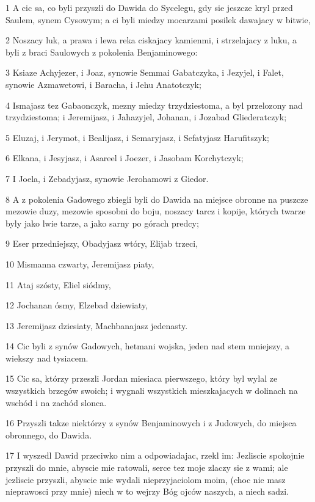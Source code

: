 \par 1 A cic sa, co byli przyszli do Dawida do Sycelegu, gdy sie jeszcze kryl przed Saulem, synem Cysowym; a ci byli miedzy mocarzami posilek dawajacy w bitwie,
\par 2 Noszacy luk, a prawa i lewa reka ciskajacy kamienmi, i strzelajacy z luku, a byli z braci Saulowych z pokolenia Benjaminowego:
\par 3 Ksiaze Achyjezer, i Joaz, synowie Semmai Gabatczyka, i Jezyjel, i Falet, synowie Azmawetowi, i Baracha, i Jehu Anatotczyk;
\par 4 Ismajasz tez Gabaonczyk, mezny miedzy trzydziestoma, a byl przelozony nad trzydziestoma; i Jeremijasz, i Jahazyjel, Johanan, i Jozabad Gliederatczyk;
\par 5 Eluzaj, i Jerymot, i Bealijasz, i Semaryjasz, i Sefatyjasz Harufitszyk;
\par 6 Elkana, i Jesyjasz, i Asareel i Joezer, i Jasobam Korchytczyk;
\par 7 I Joela, i Zebadyjasz, synowie Jerohamowi z Giedor.
\par 8 A z pokolenia Gadowego zbiegli byli do Dawida na miejsce obronne na puszcze mezowie duzy, mezowie sposobni do boju, noszacy tarcz i kopije, których twarze byly jako lwie tarze, a jako sarny po górach predcy;
\par 9 Eser przedniejszy, Obadyjasz wtóry, Elijab trzeci,
\par 10 Mismanna czwarty, Jeremijasz piaty,
\par 11 Ataj szósty, Eliel siódmy,
\par 12 Jochanan ósmy, Elzebad dziewiaty,
\par 13 Jeremijasz dziesiaty, Machbanajasz jedenasty.
\par 14 Cic byli z synów Gadowych, hetmani wojska, jeden nad stem mniejszy, a wiekszy nad tysiacem.
\par 15 Cic sa, którzy przeszli Jordan miesiaca pierwszego, który byl wylal ze wszystkich brzegów swoich; i wygnali wszystkich mieszkajacych w dolinach na wschód i na zachód slonca.
\par 16 Przyszli takze niektórzy z synów Benjaminowych i z Judowych, do miejsca obronnego, do Dawida.
\par 17 I wyszedl Dawid przeciwko nim a odpowiadajac, rzekl im: Jezliscie spokojnie przyszli do mnie, abyscie mie ratowali, serce tez moje zlaczy sie z wami; ale jezliscie przyszli, abyscie mie wydali nieprzyjaciolom moim, (choc nie masz nieprawosci przy mnie) niech w to wejrzy Bóg ojców naszych, a niech sadzi.
